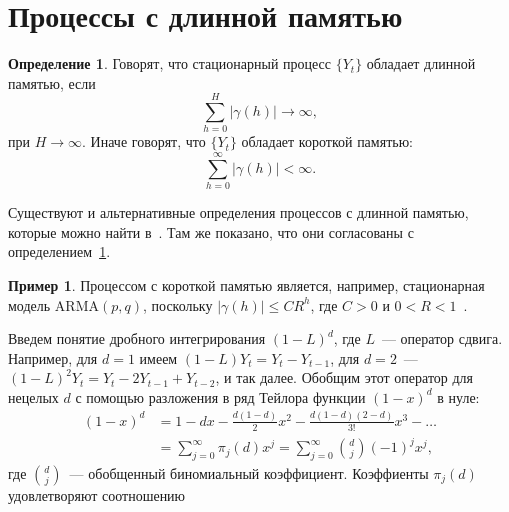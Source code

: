 \documentclass[specialist,
substylefile = spbu_report.rtx,
subf,href,colorlinks=true, 12pt]{disser}
\theoremstyle{definition}
\newtheorem{definition}{Определение}[section]
\newtheorem{example}{Пример}[section]
\begin{document}
\section{Процессы с длинной памятью}
\begin{definition}\label{def:longmemory}
	Говорят, что стационарный процесс $\{Y_t\}$ обладает длинной памятью, если
	\[
		\sum_{h=0}^H|\gamma(h)|\to\infty,
	\]
	при $H\to\infty$. Иначе говорят, что $\{Y_t\}$ обладает короткой памятью:
	\[
		\sum_{h=0}^\infty|\gamma(h)|<\infty.
	\]
\end{definition}
Существуют и альтернативные определения процессов с длинной памятью, которые можно найти в~\cite[Section 3.1]{Palma2006}. Там же показано, что они согласованы с определением~\ref{def:longmemory}.
\begin{example}
	Процессом с короткой памятью является, например, стационарная модель $\mathrm{ARMA}(p, q)$, поскольку $|\gamma(h)|\leqslant CR^h$, где $C>0$ и $0<R<1$~\cite{BoxJenkins2016}.
\end{example}
Введем понятие дробного интегрирования $(1-L)^d$, где $L$~--- оператор сдвига. Например, для $d=1$ имеем $(1-L)Y_t=Y_t-Y_{t-1}$, для $d=2$~--- $(1-L)^2Y_t=Y_t-2Y_{t-1}+Y_{t-2}$, и так далее. Обобщим этот оператор для нецелых $d$ с помощью разложения в ряд Тейлора функции $(1-x)^d$ в нуле:
\[
	\begin{aligned}
		(1-x)^d & =1-dx-\frac{d(1-d)}{2}x^2-\frac{d(1-d)(2-d)}{3!}x^3-\ldots             \\
		        & =\sum_{j=0}^\infty \pi_j(d)x^j=\sum_{j=0}^\infty\binom{d}{j}(-1)^jx^j,
	\end{aligned}
\]
где $\binom{d}{j}$~--- обобщенный биномиальный коэффициент. Коэффиенты $\pi_j(d)$ удовлетворяют соотношению
\end{document}
